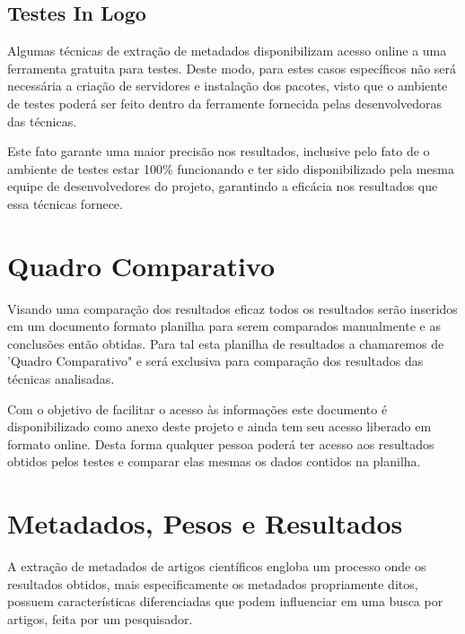 \subsection{Testes In Logo}
\label{ssec:in-loco-tests}


Algumas técnicas de extração de metadados disponibilizam acesso online a uma ferramenta gratuita para testes. Deste modo, para estes casos específicos não será necessária a criação de servidores e instalação dos pacotes, visto que o ambiente de testes poderá ser feito dentro da ferramente fornecida pelas desenvolvedoras das técnicas.


Este fato garante uma maior precisão nos resultados, inclusive pelo fato de o ambiente de testes estar 100\% funcionando e ter sido disponibilizado pela mesma equipe de desenvolvedores do projeto, garantindo a eficácia nos resultados que essa técnicas fornece.

\section{Quadro Comparativo}
\label{sec:comparative-board}

Visando uma comparação dos resultados eficaz todos os resultados serão inseridos em um documento formato planilha para serem comparados manualmente e as conclusões então obtidas. Para tal esta planilha de resultados a chamaremos de 'Quadro Comparativo" e será exclusiva para comparação dos resultados das técnicas analisadas.


Com o objetivo de facilitar o acesso às informações este documento é disponibilizado como anexo deste projeto e ainda tem seu acesso liberado em formato online. Desta forma qualquer pessoa poderá ter acesso aos resultados obtidos pelos testes e comparar elas mesmas os dados contidos na planilha.

\section{Metadados, Pesos e Resultados}
\label{sec:metadata-results}


A extração de metadados de artigos científicos engloba um processo onde os resultados obtidos, mais especificamente os metadados propriamente ditos, possuem características diferenciadas que podem influenciar em uma busca por artigos, feita por um pesquisador.

